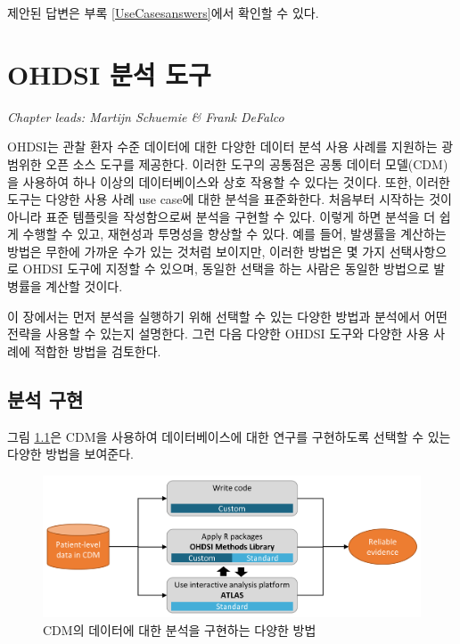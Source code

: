 \documentclass[10.5pt]{book}
\theoremstyle{definition}
\theoremstyle{definition}
\theoremstyle{definition}
\theoremstyle{remark}
\begin{document}
제안된 답변은 부록 \ref{UseCasesanswers}에서 확인할 수 있다.

\chapter{OHDSI 분석 도구}\label{OhdsiAnalyticsTools}

\emph{Chapter leads: Martijn Schuemie \& Frank DeFalco}

OHDSI는 관찰 환자 수준 데이터에 대한 다양한 데이터 분석 사용 사례를
지원하는 광범위한 오픈 소스 도구를 제공한다. 이러한 도구의 공통점은 공통
데이터 모델(CDM)을 사용하여 하나 이상의 데이터베이스와 상호 작용할 수
있다는 것이다. 또한, 이러한 도구는 다양한 사용 사례 use case에 대한
분석을 표준화한다. 처음부터 시작하는 것이 아니라 표준 템플릿을
작성함으로써 분석을 구현할 수 있다. 이렇게 하면 분석을 더 쉽게 수행할 수
있고, 재현성과 투명성을 향상할 수 있다. 예를 들어, 발생률을 계산하는
방법은 무한에 가까운 수가 있는 것처럼 보이지만, 이러한 방법은 몇 가지
선택사항으로 OHDSI 도구에 지정할 수 있으며, 동일한 선택을 하는 사람은
동일한 방법으로 발병률을 계산할 것이다.

이 장에서는 먼저 분석을 실행하기 위해 선택할 수 있는 다양한 방법과
분석에서 어떤 전략을 사용할 수 있는지 설명한다. 그런 다음 다양한 OHDSI
도구와 다양한 사용 사례에 적합한 방법을 검토한다.

\section{분석 구현}\label{analysisImplementation}

그림 \ref{fig:implementations}은 CDM을 사용하여 데이터베이스에 대한
연구를 구현하도록 선택할 수 있는 다양한 방법을 보여준다.

\begin{figure}

{\centering \includegraphics[width=0.9\linewidth]{images/OhdsiAnalyticsTools/implementations} 

}

\caption{CDM의 데이터에 대한 분석을 구현하는 다양한 방법}\label{fig:implementations}
\end{figure}
\end{document}
